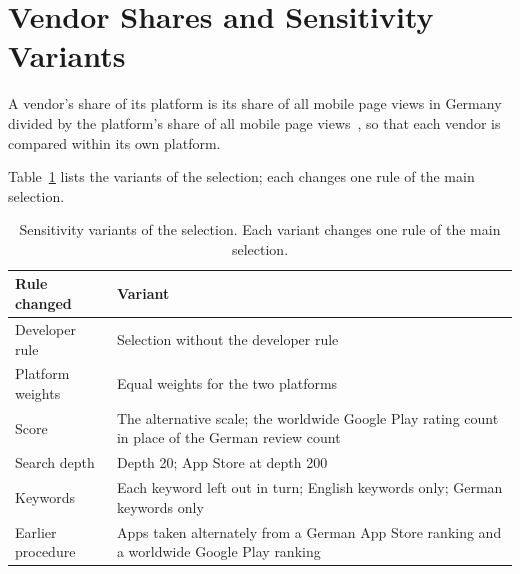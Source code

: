 \section{Vendor Shares and Sensitivity Variants}
A vendor's share of its platform is its share of all mobile page
views in Germany~\parencite{statcounter2026vendor} divided by the platform's share of all mobile
page views~\parencite{statcounter2026os}, so that each vendor is compared within its own
platform.

Table~\ref{tab:sensitivity-variants} lists the variants of
the selection; each changes one rule of the main selection.

\begin{table}[H]
\centering
\begin{singlespace}
\caption{Sensitivity variants of the selection. Each variant changes one rule of the main
selection.}
\label{tab:sensitivity-variants}
\small
\begin{tabularx}{\textwidth}{@{}l>{\raggedright\arraybackslash}X@{}}
\toprule
\textbf{Rule changed} & \textbf{Variant} \\
\midrule
Developer rule & Selection without the developer rule \\
Platform weights & Equal weights for the two platforms \\
Score & The alternative scale; the worldwide Google Play rating count in place of the German review count \\
Search depth & Depth 20; App Store at depth 200 \\
Keywords & Each keyword left out in turn; English keywords only; German keywords only \\
Earlier procedure & Apps taken alternately from a German App Store ranking and a worldwide Google Play ranking \\
\bottomrule
\end{tabularx}
\end{singlespace}
\end{table}
